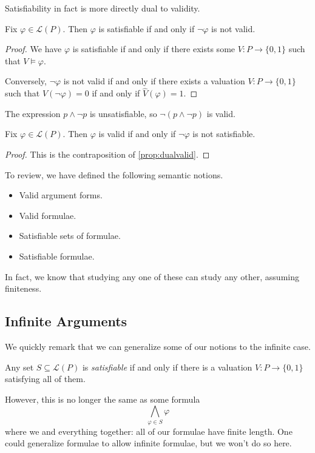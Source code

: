 Satisfiability in fact is more directly dual to validity.
\begin{proposition} \label{prop:dualvalid}
	Fix $\varphi\in\mathcal L(P)$. Then $\varphi$ is satisfiable if and only if $\lnot\varphi$ is not valid.
\end{proposition}
\begin{proof}
	We have $\varphi$ is satisfiable if and only if there exists some $V:P\to\{0,1\}$ such that $V\models\varphi$.

	Conversely, $\lnot\varphi$ is not valid if and only if there exists a valuation $V:P\to\{0,1\}$ such that $\hat V(\lnot\varphi)=0$ if and only if $\hat V(\varphi)=1$.
\end{proof}
\begin{example}
	The expression $p\land\lnot p$ is unsatisfiable, so $\lnot(p\land\lnot p)$ is valid.
\end{example}
\begin{corollary}
	Fix $\varphi\in\mathcal L(P)$. Then $\varphi$ is valid if and only if $\lnot\varphi$ is not satisfiable.
\end{corollary}
\begin{proof}
	This is the contraposition of \autoref{prop:dualvalid}.
\end{proof}
To review, we have defined the following semantic notions.
\begin{itemize}
	\item Valid argument forms.
	\item Valid formulae.
	\item Satisfiable sets of formulae.
	\item Satisfiable formulae.
\end{itemize}
In fact, we know that studying any one of these can study any other, assuming finiteness.

\subsection{Infinite Arguments}
We quickly remark that we can generalize some of our notions to the infinite case.
\begin{definition}[Satisfiable]
	Any set $S\subseteq\mathcal L(P)$ is \textit{satisfiable} if and only if there is a valuation $V:P\to\{0,1\}$ satisfying all of them.
\end{definition}
However, this is no longer the same as some formula
\[\bigwedge_{\varphi\in S}\varphi\]
where we and everything together: all of our formulae have finite length. One could generalize formulae to allow infinite formulae, but we won't do so here.

